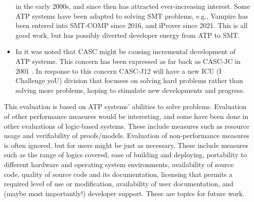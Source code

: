 \documentclass[runningheads]{llncs}
\begin{document}
\begin{itemize}
      in the early 2000s, and since then has attracted ever-increasing interest.
      Some ATP systems have been adapted to solving SMT problems, e.g., Vampire has been entered
      into SMT-COMP since 2016, and iProver since 2021.
      This is all good work, but has possibly diverted developer energy from ATP to SMT.
\item In \cite{SD24-CASC} it was noted that CASC might be causing incremental development of ATP
      systems.
      This concern has been expressed as far back as CASC-JC in 2001 \cite{PSS02}.
      In response to this concern CASC-J12 will have a new ICU (I Challenge yoU) division that
      focusses on solving hard problems rather than solving more problems, hoping to stimulate
      new developments and progress.
\end{itemize}

This evaluation is based on ATP systems' abilities to solve problems.
Evaluation of other performance measures would be interesting, and some have been done
in other evaluations of logic-based systems.
These include measures such as resource usage and verifiability of proofs/models.
Evaluation of non-performance measures is often ignored, but for users might be just as
necessary.
These include measures such as 
the range of logics covered, 
ease of building and deploying,
portability to different hardware and operating system environments, 
availability of source code, 
quality of source code and its documentation,
licensing that permits a required level of use or modification, 
availability of user documentation, 
and (maybe most importantly!)
developer support.
These are topics for future work.



\end{document}
